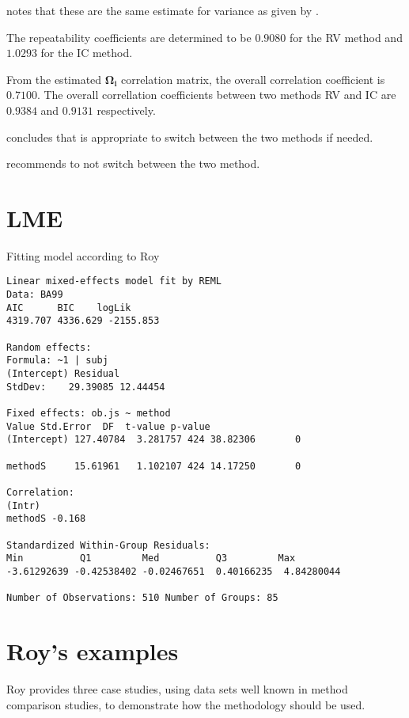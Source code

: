 \citet{roy} notes that these are the same estimate for variance as given by \citet{BA99}.


The repeatability coefficients are determined to be $0.9080$ for the RV method and $1.0293$ for the IC method.

From the estimated $\boldsymbol{\Omega_{i}}$ correlation matrix, the overall correlation coefficient is $0.7100$.
The overall correllation coefficients between two methods RV and IC are $0.9384$ and $0.9131$ respectively.

\citet{roy} concludes that is appropriate to switch between the two methods if needed.


\citet{haber}

\citet{roy} recommends to not switch between the two method.

\section{LME}

Fitting model according to Roy

\newpage
\begin{verbatim}
Linear mixed-effects model fit by REML
Data: BA99
AIC      BIC    logLik
4319.707 4336.629 -2155.853

Random effects:
Formula: ~1 | subj
(Intercept) Residual
StdDev:    29.39085 12.44454

Fixed effects: ob.js ~ method
Value Std.Error  DF  t-value p-value
(Intercept) 127.40784  3.281757 424 38.82306       0

methodS     15.61961   1.102107 424 14.17250       0

Correlation:
(Intr)
methodS -0.168

Standardized Within-Group Residuals:
Min          Q1         Med          Q3         Max
-3.61292639 -0.42538402 -0.02467651  0.40166235  4.84280044

Number of Observations: 510 Number of Groups: 85

\end{verbatim}

\newpage
\section{Roy's examples}
Roy provides three case studies, using data sets well known in method comparison studies, to demonstrate how the methodology should be used.


